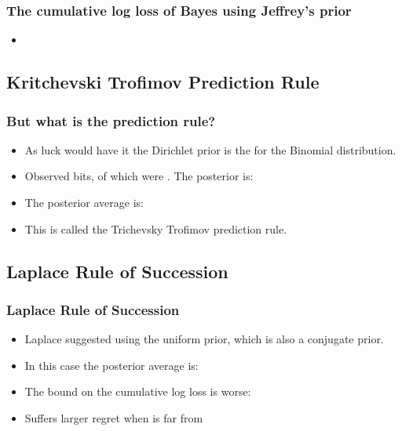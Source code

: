 \documentclass[handout]{beamer}
\begin{document}
\begin{frame}
\frametitle{The cumulative log loss of Bayes using Jeffrey's prior}
\begin{itemize}
\item
{}
\end{itemize}
\end{frame}

\subsection{Kritchevski Trofimov Prediction Rule}
\begin{frame}
\frametitle{But what is the prediction rule?}
\begin{itemize}
\item As luck would have it the Dirichlet prior is the  for the Binomial distribution.
\item
Observed  bits,  of which were . The posterior is:
\R{\[
\frac{1}{Z \sqrt{\theta(1-\theta)}} \theta^n (1-\theta)^{t-n} 
 = 
\frac{1}{Z} \theta^{n-1/2} (1-\theta)^{t-n-1/2} 
\]}
\item
The posterior average is:
\R{\[
\frac{\int_0^1 \theta^{n+1/2} (1-\theta)^{t-n-1/2} d\theta}
{\int_0^1 \theta^{n-1/2} (1-\theta)^{t-n-1/2} d\theta}
=
\frac{n+1/2}{t+1}
\]}
\item This is called the Trichevsky Trofimov prediction rule.
\end{itemize}
\end{frame}

\subsection{Laplace Rule of Succession}
\begin{frame}
\frametitle{Laplace Rule of Succession}
\begin{itemize}
\item
Laplace suggested using the uniform prior, which is also a conjugate prior.
\item In this case the posterior average is:
\R{\[
\frac{\int_0^1 \theta^{n+1} (1-\theta)^{t-n} d\theta}
{\int_0^1 \theta^{n} (1-\theta)^{t-n} d\theta}
=
\frac{n+1}{t+2}
\]}
\item
The bound on the cumulative log loss is worse:
\R{\[
\TAloss - \BEloss = \ln T + O(1)
\]}
\item
Suffers larger regret when \R{$\btheta$} is far from 
\end{itemize}
\end{frame}
\end{document}

